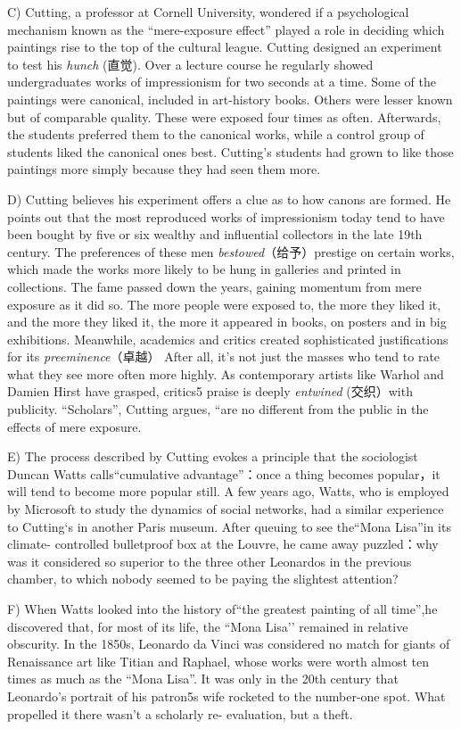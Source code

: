 \documentclass[UTF8,11pt]{ctexart}
\begin{document}
C) Cutting, a professor at Cornell University, wondered if a psychological mechanism known as the “mere-exposure effect” played a role in deciding which paintings rise to the top of the cultural league. Cutting designed an experiment to test his \textit{hunch} (直觉). Over a lecture course he regularly showed undergraduates works of impressionism for two seconds at a time. Some of the paintings were canonical, included in art-history books. Others were lesser known but of comparable quality. These were exposed four times as often. Afterwards, the students preferred them to the canonical works, while a control group of students liked the canonical ones best. Cutting’s students had grown to like those paintings more simply because they had seen them more.


D) Cutting believes his experiment offers a clue as to how canons are formed. He points out that the most reproduced works of impressionism today tend to have been bought by five or six wealthy and influential collectors in the late 19th century. The preferences of these men\textit{ bestowed}（给予）prestige on certain works, which made the works more likely to be hung in galleries and printed in collections. The fame passed down the years, gaining momentum from mere exposure as it did so. The more people were exposed to, the more they liked it, and the more they liked it, the more it appeared in books, on posters and in big exhibitions. Meanwhile, academics and critics created sophisticated justifications for its\textit{ preeminence}（卓越） After all, it’s not just the masses who tend to rate what they see more often more highly. As contemporary artists like Warhol and Damien Hirst have grasped, critics5 praise is deeply\textit{ entwined} (交织）with publicity. “Scholars”, Cutting argues, “are no different from the public in the effects of mere exposure.


E) The process described by Cutting evokes a principle that the sociologist Duncan Watts calls“cumulative advantage”：once a thing becomes popular，it will tend to become more popular still. A few years ago, Watts, who is employed by Microsoft to study the dynamics of social networks, had a similar experience to Cutting‘s in another Paris museum. After queuing to see the“Mona Lisa”in its climate- controlled bulletproof box at the Louvre, he came away puzzled：why was it considered so superior to the three other Leonardos in the previous chamber, to which nobody seemed to be paying the slightest attention?


F) When Watts looked into the history of“the greatest painting of all time”,he discovered that, for most of its life, the “Mona Lisa’’ remained in relative obscurity. In the 1850s, Leonardo da Vinci was considered no match for giants of Renaissance art like Titian and Raphael, whose works were worth almost ten times as much as the “Mona Lisa”. It was only in the 20th century that Leonardo’s portrait of his patron5s wife rocketed to the number-one spot. What propelled it there wasn’t a scholarly re- evaluation, but a theft.
\end{document}
